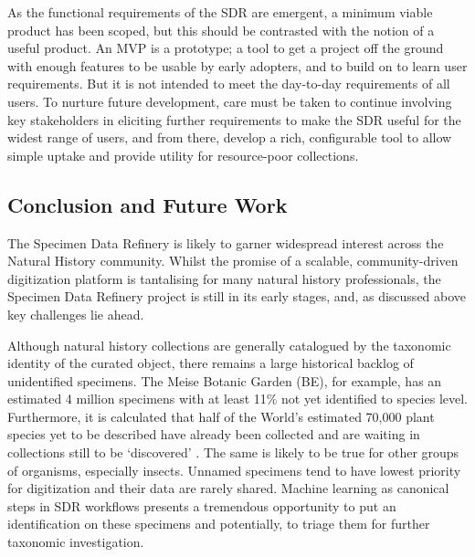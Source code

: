 As the functional requirements of the SDR are emergent, a minimum viable
product has been scoped, but this should be contrasted with the notion
of a useful product. An MVP is a prototype; a tool to get a project off
the ground with enough features to be usable by early adopters, and to
build on to learn user requirements. But it is not intended to meet the
day-to-day requirements of all users. To nurture future development,
care must be taken to continue involving key stakeholders in eliciting
further requirements to make the SDR useful for the widest range of
users, and from there, develop a rich, configurable tool to allow simple
uptake and provide utility for resource-poor collections.

\subsection{Conclusion and Future Work}\label{conclusion-and-future-work}

The Specimen Data Refinery is likely to garner widespread interest
across the Natural History community. Whilst the promise of a scalable,
community-driven digitization platform is tantalising for many natural
history professionals, the Specimen Data Refinery project is still in
its early stages, and, as discussed above key challenges lie ahead.

Although natural history collections are generally catalogued by the
taxonomic identity of the curated object, there remains a large
historical backlog of unidentified specimens. The Meise Botanic Garden
(BE), for example, has an estimated 4 million specimens with at least
11\% not yet identified to species level. Furthermore, it is calculated
that half of the World's estimated 70,000 plant species yet to be
described have already been collected and are waiting in collections
still to be `discovered' \cite{Crusoe 2022}. The same is likely to be true for
other groups of organisms, especially insects. Unnamed specimens tend to
have lowest priority for digitization and their data are rarely shared.
Machine learning as canonical steps in SDR workflows presents a
tremendous opportunity to put an identification on these specimens and
potentially, to triage them for further taxonomic investigation.


